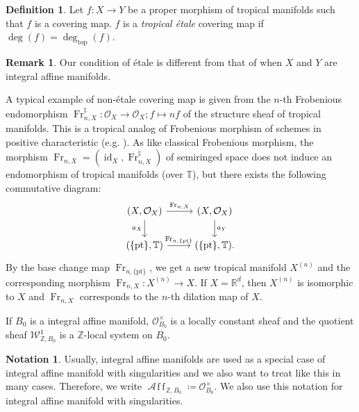 \documentclass[a4paper,dvipdfmx,reqno,12pt]{amsart}
\theoremstyle{definition}
\newtheorem{definition}[theorem]{Definition}
\newtheorem{Not}[theorem]{Notation}
\newtheorem{remark}[theorem]{Remark}
\newcommand{\deq}{\coloneqq}
\newcommand{\Z}{\mathbb{Z}}%
\newcommand{\mcal}[1]{\mathcal{#1}}%
\newcommand{\opn}[1]{\operatorname{#1}}
\newcommand{\AffS}{{\mathop{\mcal{A}\!f\!\!f\!}\nolimits}}
\numberwithin{equation}{section}
\begin{document}
\begin{definition} \label{definition-etale-covering}
Let $f\colon X\to Y$ be a proper morphism 
of tropical manifolds such
that $f$ is a covering map.
$f$ is a \emph{tropical \'etale} covering map 
if $\opn{deg}(f)=\opn{deg}_{\mathrm{top}}(f)$.  
\end{definition}
\begin{remark}
Our condition of \'etale is different from that of 
\cite[Definition 1.1]{grossMirrorSymmetryLogarithmic2006a}
when $X$ and $Y$ are integral affine manifolds.
\end{remark}

A typical example of non-\'etale covering map is given
from the $n$-th Frobenious endomorphism 
$\opn{Fr}_{n,X}^{\natural}\colon \mathcal{O}_X \to \mathcal{O}_X; f\mapsto nf$ of 
the structure sheaf of tropical manifolds. 
This is a tropical analog of Frobenious morphism of 
schemes in positive characteristic 
(e.g. \cite[]{}). As like classical Frobenious morphism, 
the morphism $\opn{Fr}_{n,X}=(\opn{id}_X,\opn{Fr}_{n,X}^{\natural})$ of semiringed space does 
not induce an endomorphism of tropical manifolds 
(over $\mathbb{T}$), but
there exists the following commutative diagram:
\begin{equation}
\begin{tikzcd}
 (X,\mathcal{O}_X) \arrow[r,"{\opn{Fr}_{n,X}}"] 
\arrow[d,"{a_X}"']
 &   (X,\mathcal{O}_X) \arrow[d,"{a_Y}"] \\
(\{\opn{pt}\},\mathbb{T})
\arrow[r,"{\opn{Fr}_{n,\{\opn{pt}\}}}"]
 & (\{\opn{pt}\},\mathbb{T}).
\end{tikzcd}
\end{equation}
By the base change map $\opn{Fr}_{n,\{\mathrm{pt}\}}$, we get 
a new tropical manifold $X^{(n)}$
and the corresponding morphism 
$\opn{Fr}_{n,X}\colon X^{(n)}\to X$. 
If $X=\mathbb{R}^{d}$, then $X^{(n)}$ is 
isomorphic to $X$ and 
$\opn{Fr}_{n,X}$ corresponds to 
the $n$-th dilation map of $X$.


If $B_0$ is a integral affine manifold, 
$\mcal{O}^{\times}_{B_0}$ is a locally constant sheaf and the quotient sheaf $\mcal{W}^{1}_{\Z,B_0}$ is a $\Z$-local system on $B_0$.

\begin{Not}
  Usually, integral affine manifolds are used as a special case of integral affine manifold with singularities and we also want to treat like this in many cases.
  Therefore, we write 
$\AffS_{\Z,B_0}\deq \mcal{O}^{\times}_{B_0}$. We also use this notation for integral affine manifold with singularities.
\end{Not}
\end{document}
